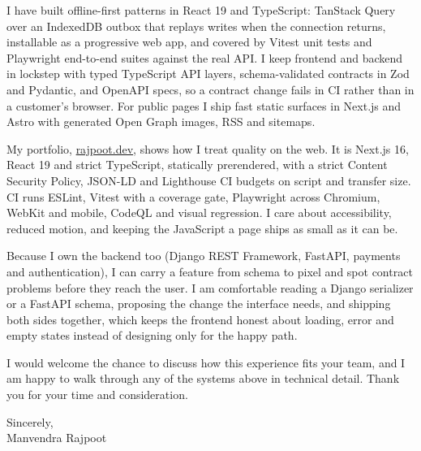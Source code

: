 \documentclass[11pt,a4paper]{article}
\begin{document}
I have built offline-first patterns in React 19 and TypeScript: TanStack Query
over an IndexedDB outbox that replays writes when the connection returns, installable as
a progressive web app, and covered by Vitest unit tests and Playwright end-to-end suites
against the real API. I keep frontend and backend in lockstep with typed TypeScript API
layers, schema-validated contracts in Zod and Pydantic, and OpenAPI specs, so a contract
change fails in CI rather than in a customer's browser. For public pages I ship fast
static surfaces in Next.js and Astro with generated Open Graph images, RSS and sitemaps.

My portfolio, \href{https://www.rajpoot.dev}{rajpoot.dev}, shows how I treat
quality on the web. It is Next.js 16, React 19 and strict TypeScript, statically
prerendered, with a strict Content Security Policy, JSON-LD and Lighthouse CI budgets on
script and transfer size. CI runs ESLint, Vitest with a coverage gate, Playwright across
Chromium, WebKit and mobile, CodeQL and visual regression. I care about accessibility,
reduced motion, and keeping the JavaScript a page ships as small as it can be.

Because I own the backend too (Django REST Framework, FastAPI, payments and
authentication), I can carry a feature from schema to pixel and spot contract problems
before they reach the user. I am comfortable reading a
Django serializer or a FastAPI schema, proposing the change the interface needs, and
shipping both sides together, which keeps the frontend honest about loading, error and
empty states instead of designing only for the happy path.

I would welcome the chance to discuss how this experience fits your team, and I am
happy to walk through any of the systems above in technical detail. Thank you for your
time and consideration.


Sincerely,\\[6pt]
Manvendra Rajpoot
\end{document}
